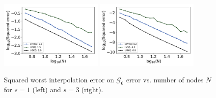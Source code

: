 \documentclass[twoside,11pt]{book}
\numberwithin{theorem}{chapter}
\numberwithin{definition}{chapter}
\numberwithin{proposition}{chapter}
\numberwithin{corollary}{chapter}
\numberwithin{example}{chapter}
\numberwithin{lemma}{chapter}
\begin{document}
\begin{figure}
\centering
\includegraphics[width=0.45\textwidth]{img/neurips/Sobolev/suponunitball_interpolation_pSobolev_s_1_binarycubeM_64_fig_1.pdf}
\includegraphics[width=0.45\textwidth]{img/neurips/Sobolev/suponunitball_interpolation_pSobolev_s_3_binarycubeM_64_fig_1.pdf}\\
\caption{Squared worst interpolation error on $\mathcal{G}_{6}$ error vs. number of nodes $N$ for $s = 1$ (left) and $s=3$ (right).
\label{fig:pDPP_results_pSobolev_exp_3_G6}}
\end{figure}
\end{document}
